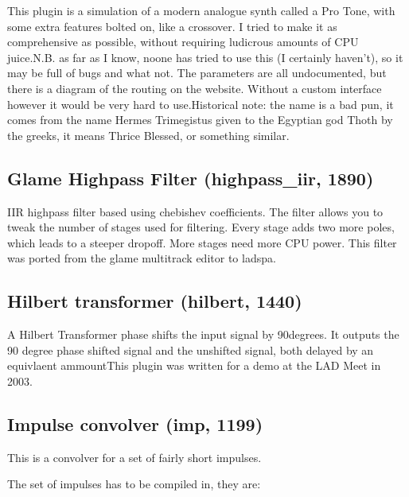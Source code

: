 \documentclass[11pt]{article}
\begin{document}
This plugin is a simulation of a modern analogue synth called a Pro Tone, with some extra features bolted on, like a crossover. I tried to make it as comprehensive as possible, without requiring ludicrous amounts of CPU juice.N.B. as far as I know, noone has tried to use this (I certainly haven't), so it may be full of bugs and what not. The parameters are all undocumented, but there is a diagram of the routing on the website. Without a custom interface however it would be very hard to use.Historical note: the name is a bad pun, it comes from the name Hermes Trimegistus given to the Egyptian god Thoth by the greeks, it means Thrice Blessed, or something similar.\subsection{Glame Highpass Filter (highpass\_iir, 1890)\label{highpass_iir}\label{id1890}}
 IIR highpass filter based using chebishev coefficients. The filter allows you to tweak the number of stages used for
                filtering. Every stage adds two more poles, which leads to a steeper dropoff. More stages need more CPU power. This
                filter was ported from the glame multitrack editor to ladspa.
                \subsection{Hilbert transformer (hilbert, 1440)\label{hilbert}\label{id1440}}
A Hilbert Transformer phase shifts the input signal by 90degrees. It outputs the 90 degree phase shifted signal and the unshifted signal, both delayed by an equivlaent ammountThis plugin was written for a demo at the LAD Meet in 2003.\subsection{Impulse convolver (imp, 1199)\label{imp}\label{id1199}}

    This is a convolver for a set of fairly short impulses.

    The set of impulses has to be compiled in, they are:
\end{document}
